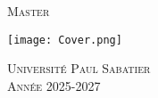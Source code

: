 \begin{titlepage}
   \begin{center}
       \vspace*{1cm}
       {
           \hfill
           \setlength{\fboxsep}{0.8em}\setlength{\fboxrule}{4pt}
           \color{DarkBlue1}\HUGE{}\hfill}

       \<
       {
       \color{DarkBlue1}\Large
       \textsc{Master}
       }
       \<

       \vspace{1.5cm}

       \texttt{[image: Cover.png]}

       \vfill

       \large
       \textsc{Université Paul Sabatier}\\
       \textsc{Année 2025-2027}
   \end{center}
\end{titlepage}